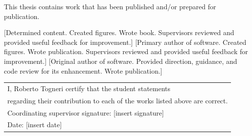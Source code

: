 \documentclass{book}
\begin{document}


\begin{flushleft}
	This thesis contains work that has been published and/or prepared for publication.

	[Determined content. Created figures. Wrote book. Supervisors reviewed and provided useful feedback for improvement.]
	[Primary author of software. Created figures. Wrote publication. Supervisors reviewed and provided useful feedback for improvement.]
	[Original author of software. Provided direction, guidance, and code review for its enhancement. Wrote publication.]
	
	\vfill
	\vskip 0.5cm
	\begin{tabular}{l}
		I, Roberto Togneri certify that the student statements \\ regarding their contribution to each of the works listed above are correct. \\
		Coordinating supervisor signature: {[insert signature]}\\
		Date: {[insert date]}
	\end{tabular}
	\vspace{3cm}
\end{flushleft}
\end{document}
